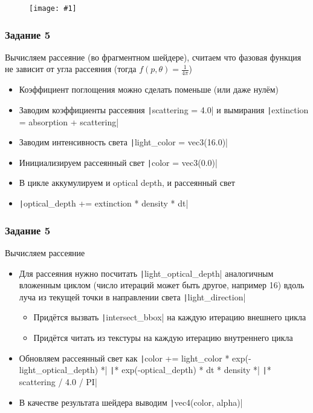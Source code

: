 \documentclass[10pt]{beamer}
\newcommand{\slideimage}[1]{
  \begin{figure}
    \begin{adjustbox}{width=\textwidth, totalheight=\textheight-2\baselineskip-2\baselineskip,keepaspectratio}
      \texttt{[image: \#1]}
    \end{adjustbox}
  \end{figure}
}
\begin{document}
\begin{frame}[fragile]
\slideimage{4.png}
\end{frame}

\begin{frame}[fragile]
\frametitle{Задание 5}
Вычисляем рассеяние (во фрагментном шейдере), считаем что фазовая функция не зависит от угла рассеяния (тогда \begin{math}f(p,\theta) = \frac{1}{4\pi}\end{math})
\begin{itemize}
\item Коэффициент поглощения можно сделать поменьше (или даже нулём)
\item Заводим коэффициенты рассеяния \texttt|scattering = 4.0| и вымирания \texttt|extinction = absorption + scattering|
\item Заводим интенсивность света \texttt|light_color = vec3(16.0)|
\item Инициализируем рассеянный свет \texttt|color = vec3(0.0)|
\item В цикле аккумулируем и optical depth, и рассеянный свет
\item \texttt|optical_depth += extinction * density * dt|
\end{itemize}
\end{frame}

\begin{frame}[fragile]
\frametitle{Задание 5}
Вычисляем рассеяние
\begin{itemize}
\item Для рассеяния нужно посчитать \texttt|light_optical_depth| аналогичным вложенным циклом (число итераций может быть другое, например 16) вдоль луча из текущей точки в направлении света \texttt|light_direction|
\begin{itemize}
\item Придётся вызвать \texttt|intersect_bbox| на каждую итерацию внешнего цикла
\item Придётся читать из текстуры на каждую итерацию внутреннего цикла
\end{itemize}
\item Обновляем рассеянный свет как \texttt|color += light_color * exp(-light_optical_depth) *|
\texttt|* exp(-optical_depth) * dt * density *|
\texttt|* scattering / 4.0 / PI|
\item В качестве результата шейдера выводим \texttt|vec4(color, alpha)|
\end{itemize}
\end{frame}
\end{document}
